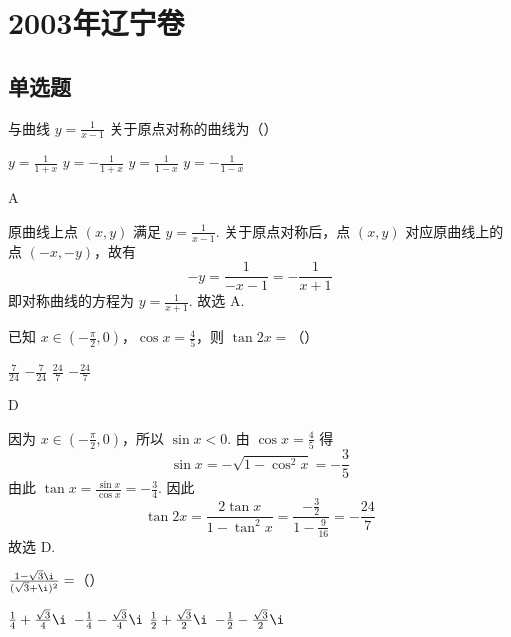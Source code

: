 \chapter{2003年辽宁卷}
\section{单选题}
\begin{problem}
与曲线 \( y = \frac{1}{x - 1} \) 关于原点对称的曲线为（\quad）

\choices
    {\( y = \frac{1}{1 + x} \)}
    {\( y = -\frac{1}{1 + x} \)}
    {\( y = \frac{1}{1 - x} \)}
    {\( y = -\frac{1}{1 - x} \)}
\end{problem}

\begin{answer}
A
\end{answer}

\begin{solution}
原曲线上点 \((x,y)\) 满足 \(y=\frac{1}{x-1}\). 关于原点对称后，点 \((x,y)\) 对应原曲线上的点 \((-x,-y)\)，故有
\[
-y=\frac{1}{-x-1}=-\frac{1}{x+1}
\]
即对称曲线的方程为 \(y=\frac{1}{x+1}\). 故选 A.
\end{solution}

\begin{problem}
已知 \(x \in \left(-\frac{\pi}{2}, 0\right)\)，\(\cos x = \frac{4}{5}\)，则 \(\tan 2x =\)（\quad）

\choices
    {\(\frac{7}{24}\)}
    {\(-\frac{7}{24}\)}
    {\(\frac{24}{7}\)}
    {\(-\frac{24}{7}\)}
\end{problem}

\begin{answer}
D
\end{answer}

\begin{solution}
因为 \(x\in\left(-\frac{\pi}{2},0\right)\)，所以 \(\sin x<0\). 由 \(\cos x=\frac45\) 得
\[
\sin x=-\sqrt{1-\cos^2x}=-\frac35
\]
由此 \(\tan x=\frac{\sin x}{\cos x}=-\frac34\).
因此
\[
\tan 2x=\frac{2\tan x}{1-\tan^2x}
=\frac{-\frac32}{1-\frac{9}{16}}
=-\frac{24}{7}
\]
故选 D.
\end{solution}

\begin{problem}
\(\frac{1 - \sqrt{3}\i}{(\sqrt{3} + \i)^2} =\)（\quad）

\choices
    {\(\frac{1}{4} + \frac{\sqrt{3}}{4}\i\)}
    {\(-\frac{1}{4} - \frac{\sqrt{3}}{4}\i\)}
    {\(\frac{1}{2} + \frac{\sqrt{3}}{2}\i\)}
    {\(-\frac{1}{2} - \frac{\sqrt{3}}{2}\i\)}
\end{problem}

